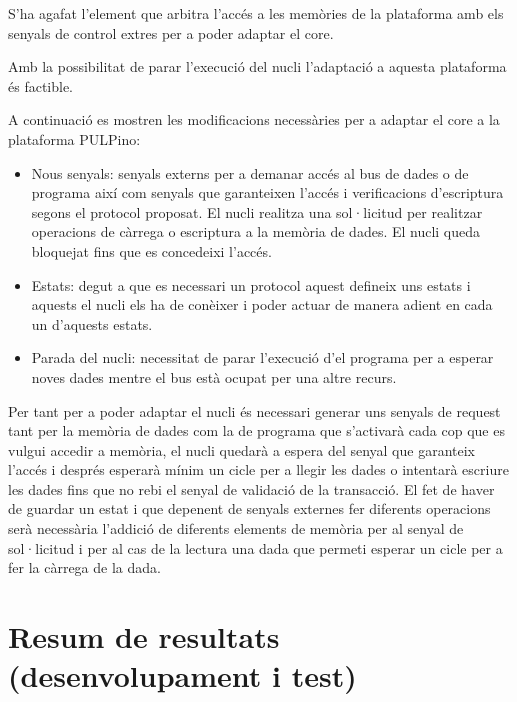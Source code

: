 \documentclass[10pt,a4paper,twocolumn,twoside]{article}
\begin{document}
    S'ha agafat l'element que arbitra l'accés a les memòries de la plataforma amb els senyals de control extres per a poder adaptar el core.
    
    Amb la possibilitat de parar l'execució del nucli l'adaptació a aquesta plataforma és factible.
    
    A continuació es mostren les modificacions necessàries per a adaptar el core a la plataforma PULPino:
    \begin{itemize}
        \item Nous senyals: senyals externs per a demanar accés al bus de dades o de programa així com senyals que garanteixen l'accés i verificacions d'escriptura segons el protocol proposat. El nucli realitza una sol·licitud per realitzar operacions de càrrega o escriptura a la memòria de dades. El nucli queda bloquejat fins que es concedeixi l’accés.
        \item Estats: degut a que es necessari un protocol aquest defineix uns estats i aquests el nucli els ha de conèixer i poder actuar de manera adient en cada un d'aquests estats. 
        \item Parada del nucli:  necessitat de parar l'execució d'el programa per a esperar noves dades mentre el bus està ocupat per una altre recurs.

    \end{itemize}
    
    Per tant per a poder adaptar el nucli és necessari generar uns senyals de request tant per la memòria de dades com la de programa que s'activarà cada cop que es vulgui accedir a memòria, el nucli quedarà a espera del senyal que garanteix l'accés i després esperarà mínim un cicle per a llegir les dades o intentarà escriure les dades fins que no rebi el senyal de validació de la transacció.
    El fet de haver de guardar un estat i que depenent de senyals externes fer diferents operacions serà necessària l'addició de diferents elements de memòria per al senyal de sol·licitud i per al cas de la lectura una dada que permeti esperar un cicle per a fer la càrrega de la dada.
        
        


\section{Resum de resultats (desenvolupament i test)}
\end{document}
